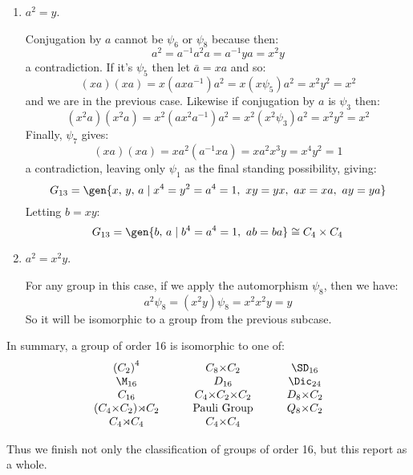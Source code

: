 \begin{enumerate}
\begin{enumerate}[\bfseries A:]
            \item \(a^2 = y\).

                Conjugation by \(a\) cannot be \(\psi_6\) or \(\psi_8\) because then:
                \[a^2 = a^{-1}a^2 a = a^{-1}ya = x^2 y\]
                a contradiction.
                If it's \(\psi_5\) then let \(\bar{a} = xa\) and so:
                \[(xa)(xa) = x(axa^{-1})a^2 = x(x\psi_5)a^2 = x^2 y^2 = x^2\]
                and we are in the previous case.
                Likewise if conjugation by \(a\) is \(\psi_3\) then:
                \[(x^2 a)(x^2 a) = x^2(ax^2 a^{-1})a^2 = x^2(x^2\psi_3)a^2 = x^2 y^2 = x^2\]
                Finally, \(\psi_7\) gives:
                \[(xa)(xa) = xa^2(a^{-1}xa) = xa^2 x^3 y = x^4 y^2 = 1\]
                a contradiction, leaving only \(\psi_1\) as the final standing possibility, giving:
                \[G_{13} = \gen{x,\,y,\,a \mid x^4 = y^2 = a^4 = 1,\ xy = yx,\ ax = xa,\ ay = ya}\]
                Letting \(b = xy\):
                \[G_{13} = \gen{b,\,a \mid b^4 = a^4 = 1,\ ab = ba} \cong C_4 \times C_4\]

            \item \(a^2 = x^2 y\).

                For any group in this case, if we apply the automorphism \(\psi_8\), then we have:
                \[a^2\psi_8 = (x^2 y)\psi_8 = x^2 x^2 y = y\]
                So it will be isomorphic to a group from the previous subcase.

        \end{enumerate}
\end{enumerate}

In summary, a group of order 16 is isomorphic to one of:
\begin{displaymath}
\begin{array}{c@{\hskip 3em}c@{\hskip 3em}c}
    {(C_2)}^4 & C_8 {\times} C_2 & \SD_{16} \\
    \M_{16} & D_{16} & \Dic_{24} \\
    C_{16} & C_4 {\times} C_2 {\times} C_2 & D_8 {\times} C_2 \\
    (C_4 {\times} C_2) {\rtimes} C_2 & \text{Pauli Group} & Q_8 {\times} C_2 \\
    C_4 {\rtimes} C_4 & C_4 {\times} C_4 & \\
\end{array}
\end{displaymath}

Thus we finish not only the classification of groups of order 16, but this report as a whole.
